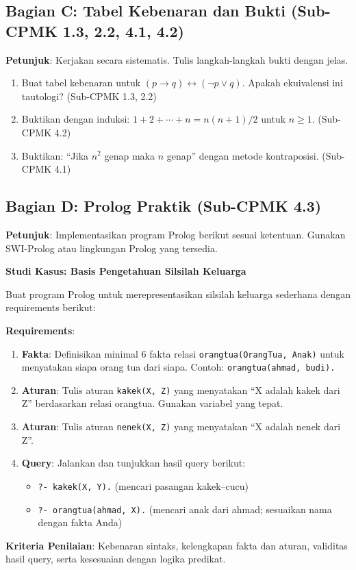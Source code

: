 \subsection{Bagian C: Tabel Kebenaran dan Bukti (Sub-CPMK 1.3, 2.2, 4.1, 4.2)}

\textbf{Petunjuk}: Kerjakan secara sistematis. Tulis langkah-langkah bukti dengan jelas.

\begin{enumerate}
  \item Buat tabel kebenaran untuk $(p \rightarrow q) \leftrightarrow (\neg p \vee q)$. Apakah ekuivalensi ini tautologi? (Sub-CPMK 1.3, 2.2)
  \item Buktikan dengan induksi: $1 + 2 + \cdots + n = n(n+1)/2$ untuk $n \geq 1$. (Sub-CPMK 4.2)
  \item Buktikan: ``Jika $n^2$ genap maka $n$ genap'' dengan metode kontraposisi. (Sub-CPMK 4.1)
\end{enumerate}

\subsection{Bagian D: Prolog Praktik (Sub-CPMK 4.3)}

\textbf{Petunjuk}: Implementasikan program Prolog berikut sesuai ketentuan. Gunakan SWI-Prolog atau lingkungan Prolog yang tersedia.

\textbf{Studi Kasus: Basis Pengetahuan Silsilah Keluarga}

Buat program Prolog untuk merepresentasikan silsilah keluarga sederhana dengan requirements berikut:

\textbf{Requirements}:
\begin{enumerate}
  \item \textbf{Fakta}: Definisikan minimal 6 fakta relasi \texttt{orangtua(OrangTua, Anak)} untuk menyatakan siapa orang tua dari siapa. Contoh: \texttt{orangtua(ahmad, budi).}
  \item \textbf{Aturan}: Tulis aturan \texttt{kakek(X, Z)} yang menyatakan ``X adalah kakek dari Z'' berdasarkan relasi orangtua. Gunakan variabel yang tepat.
  \item \textbf{Aturan}: Tulis aturan \texttt{nenek(X, Z)} yang menyatakan ``X adalah nenek dari Z''.
  \item \textbf{Query}: Jalankan dan tunjukkan hasil query berikut:
  \begin{itemize}
    \item \texttt{?- kakek(X, Y).} (mencari pasangan kakek--cucu)
    \item \texttt{?- orangtua(ahmad, X).} (mencari anak dari ahmad; sesuaikan nama dengan fakta Anda)
  \end{itemize}
\end{enumerate}

\textbf{Kriteria Penilaian}: Kebenaran sintaks, kelengkapan fakta dan aturan, validitas hasil query, serta kesesuaian dengan logika predikat.
